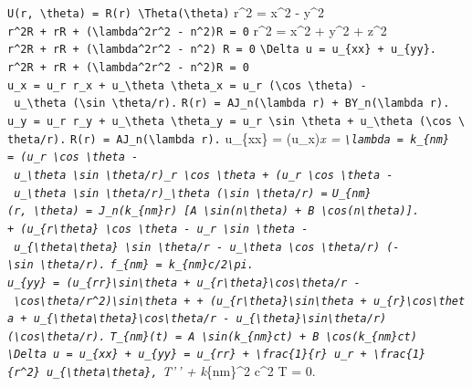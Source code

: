 \documentclass[
  ukrainian,
]{article}
\begin{document}
\texttt{U(r,\ \textbackslash{}theta)\ =\ R(r)\ \textbackslash{}Theta(\textbackslash{}theta)}
r\^{}2 = x\^{}2 - y\^{}2
\texttt{r\^{}2R\textquotesingle{}\textquotesingle{}\ +\ rR\textquotesingle{}\ +\ (\textbackslash{}lambda\^{}2r\^{}2\ -\ n\^{}2)R\ =\ 0}
r\^{}2 = x\^{}2 + y\^{}2 + z\^{}2
\texttt{r\^{}2R\textquotesingle{}\textquotesingle{}\ +\ rR\textquotesingle{}\ +\ (\textbackslash{}lambda\^{}2r\^{}2\ -\ n\^{}2)\ R\ =\ 0}
\texttt{\textbackslash{}Delta\ u\ =\ u\_\{xx\}\ +\ u\_\{yy\}.}
\texttt{r\^{}2R\textquotesingle{}\textquotesingle{}\ +\ rR\textquotesingle{}\ +\ (\textbackslash{}lambda\^{}2r\^{}2\ -\ n\^{}2)R\ =\ 0}
\texttt{u\_x\ =\ u\_r\ r\_x\ +\ u\_\textbackslash{}theta\ \textbackslash{}theta\_x\ =\ u\_r\ (\textbackslash{}cos\ \textbackslash{}theta)\ -\ u\_\textbackslash{}theta\ (\textbackslash{}sin\ \textbackslash{}theta/r).}
\texttt{R(r)\ =\ AJ\_n(\textbackslash{}lambda\ r)\ +\ BY\_n(\textbackslash{}lambda\ r).}
\texttt{u\_y\ =\ u\_r\ r\_y\ +\ u\_\textbackslash{}theta\ \textbackslash{}theta\_y\ =\ u\_r\ \textbackslash{}sin\ \textbackslash{}theta\ +\ u\_\textbackslash{}theta\ (\textbackslash{}cos\ \textbackslash{}theta/r).}
\texttt{R(r)\ =\ AJ\_n(\textbackslash{}lambda\ r).} u\_\{xx\} =
(u\_x)\emph{x = \texttt{\textbackslash{}lambda\ =\ k\_\{nm\}}
\texttt{=\ (u\_r\ \textbackslash{}cos\ \textbackslash{}theta\ -\ u\_\textbackslash{}theta\ \textbackslash{}sin\ \textbackslash{}theta/r)\_r\ \textbackslash{}cos\ \textbackslash{}theta\ +\ (u\_r\ \textbackslash{}cos\ \textbackslash{}theta\ -\ u\_\textbackslash{}theta\ \textbackslash{}sin\ \textbackslash{}theta/r)\_\textbackslash{}theta\ (\textbackslash{}sin\ \textbackslash{}theta/r)\ =}
\texttt{U\_\{nm\}(r,\ \textbackslash{}theta)\ =\ J\_n(k\_\{nm\}r)\ {[}A\ \textbackslash{}sin(n\textbackslash{}theta)\ +\ B\ \textbackslash{}cos(n\textbackslash{}theta){]}.}
\texttt{+\ (u\_\{r\textbackslash{}theta\}\ \textbackslash{}cos\ \textbackslash{}theta\ -\ u\_r\ \textbackslash{}sin\ \textbackslash{}theta\ -\ u\_\{\textbackslash{}theta\textbackslash{}theta\}\ \textbackslash{}sin\ \textbackslash{}theta/r\ -\ u\_\textbackslash{}theta\ \textbackslash{}cos\ \textbackslash{}theta/r)\ (-\textbackslash{}sin\ \textbackslash{}theta/r).}
\texttt{f\_\{nm\}\ =\ k\_\{nm\}c/2\textbackslash{}pi.}
\texttt{u\_\{yy\}\ =\ (u\_\{rr\}\textbackslash{}sin\textbackslash{}theta\ +\ u\_\{r\textbackslash{}theta\}\textbackslash{}cos\textbackslash{}theta/r\ -\ \textbackslash{}cos\textbackslash{}theta/r\^{}2)\textbackslash{}sin\textbackslash{}theta\ +\ +\ (u\_\{r\textbackslash{}theta\}\textbackslash{}sin\textbackslash{}theta\ +\ u\_\{r\}\textbackslash{}cos\textbackslash{}theta\ +\ u\_\{\textbackslash{}theta\textbackslash{}theta\}\textbackslash{}cos\textbackslash{}theta/r\ -\ u\_\{\textbackslash{}theta\}\textbackslash{}sin\textbackslash{}theta/r)(\textbackslash{}cos\textbackslash{}theta/r).}
\texttt{T\_\{nm\}(t)\ =\ A\ \textbackslash{}sin(k\_\{nm\}ct)\ +\ B\ \textbackslash{}cos(k\_\{nm\}ct)}
\texttt{\textbackslash{}Delta\ u\ =\ u\_\{xx\}\ +\ u\_\{yy\}\ =\ u\_\{rr\}\ +\ \textbackslash{}frac\{1\}\{r\}\ u\_r\ +\ \textbackslash{}frac\{1\}\{r\^{}2\}\ u\_\{\textbackslash{}theta\textbackslash{}theta\},}
T'\,' + k}\{nm\}\^{}2 c\^{}2 T = 0.
\end{document}
